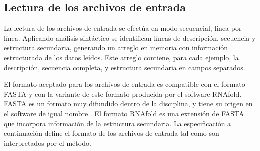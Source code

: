 %
%
\subsection{Lectura de los archivos de entrada}
%
La lectura de los archivos de entrada se efectúa en modo secuencial,
línea por línea.
Aplicando análisis sintáctico se identifican líneas de descripción,
secuencia y estructura secundaria, generando un arreglo en memoria con
información estructurada de los datos leídos.
Este arreglo contiene, para cada ejemplo, la descripción, secuencia
completa, y estructura secundaria en campos separados.

El formato aceptado para los archivos de entrada es compatible con el
formato FASTA y con la variante de este formato producida por el
software RNAfold.
FASTA es un formato muy difundido dentro de la disciplina, y tiene su
origen en el software de igual nombre \cite{fasta}.
El formato RNAfold \cite{vienna} es una extensión de FASTA que
incorpora información de la estructura secundaria.
La especificación a continuación define el formato de los archivos de
entrada tal como son interpretados por el método.
